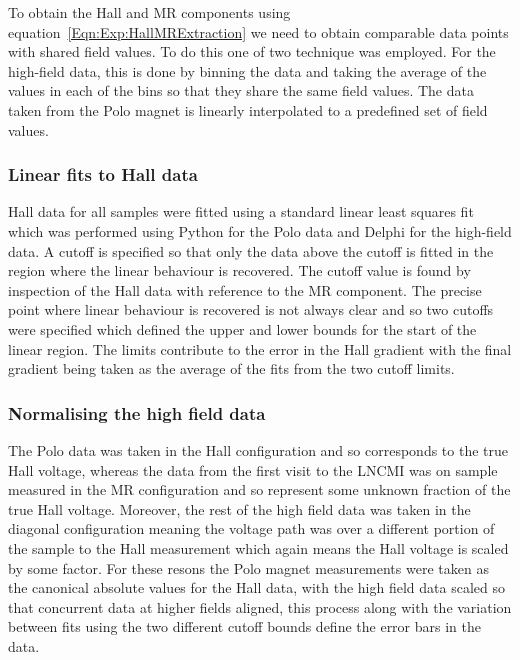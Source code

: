 To obtain the Hall and \ac{MR} components using equation~\ref{Eqn:Exp:HallMRExtraction} we need to obtain comparable data points with shared field values. To do this one of two technique was employed. For the high-field data, this is done by binning the data and taking the average of the values in each of the bins so that they share the same field values. The data taken from the Polo magnet is linearly interpolated to a predefined set of field values.

\subsubsection{Linear fits to Hall data}

Hall data for all samples were fitted using a standard linear least squares fit which was performed using Python for the Polo data and Delphi for the high-field data. A cutoff is specified so that only the data above the cutoff is fitted in the region where the linear behaviour is recovered. The cutoff value is found by inspection of the Hall data with reference to the \ac{MR} component. The precise point where linear behaviour is recovered is not always clear and so two cutoffs were specified which defined the upper and lower bounds for the start of the linear region. The limits contribute to the error in the Hall gradient with the final gradient being taken as the average of the fits from the two cutoff limits.

\subsubsection{Normalising the high field data}

The Polo data was taken in the Hall configuration and so corresponds to the true Hall voltage, whereas the data from the first visit to the \ac{LNCMI} was on sample measured in the \ac{MR} configuration and so represent some unknown fraction of the true Hall voltage. Moreover, the rest of the high field data was taken in the diagonal configuration meaning the voltage path was over a different portion of the sample to the Hall measurement which again means the Hall voltage is scaled by some factor. For these resons the Polo magnet measurements were taken as the canonical absolute values for the Hall data, with the high field data scaled so that concurrent data at higher fields aligned, this process along with the variation between fits using the two different cutoff bounds define the error bars in the data.


